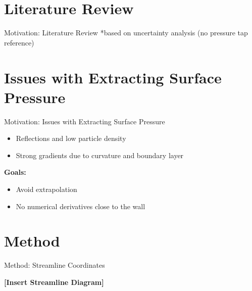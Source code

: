 \documentclass{beamer}
\begin{document}
\section{Literature Review}
\begin{frame}{Motivation: Literature Review}
    \footnotesize{*based on uncertainty analysis (no pressure tap reference)}
\end{frame}

\section{Issues with Extracting Surface Pressure}
\begin{frame}{Motivation: Issues with Extracting Surface Pressure}
    \begin{itemize}
        \item Reflections and low particle density
        \item Strong gradients due to curvature and boundary layer
    \end{itemize}
    \textbf{Goals:}
    \begin{itemize}
        \item Avoid extrapolation
        \item No numerical derivatives close to the wall
    \end{itemize}
\end{frame}

\section{Method}
\begin{frame}{Method: Streamline Coordinates}
    \begin{center}
        \textbf{[Insert Streamline Diagram]}
    \end{center}
\end{frame}
\end{document}
